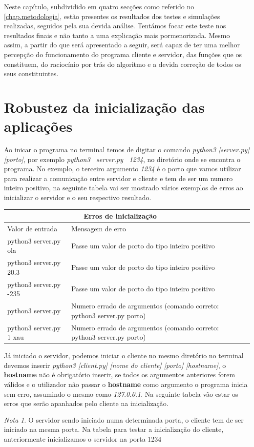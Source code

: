 \documentclass{report}
\theoremstyle{remark}
\newtheorem*{nota}{Nota}
\begin{document}
Neste capítulo, subdividido em quatro secções como referido no \autoref{chap.metodologia}, estão presentes os resultados dos testes e simulações realizadas, seguidos pela sua devida análise. Tentámos focar este teste nos resultados finais e não tanto a uma explicação mais pormenorizada. Mesmo assim, a partir do que será apresentado a seguir, será capaz de ter uma melhor percepção do funcionamento do programa cliente e servidor, das funções que os constituem, do raciocínio por trás do algoritmo e a devida correção de todos os seus constituintes.

\section{ Robustez da inicialização das aplicações}
\label{sec.rebustez}

Ao inicar o programa no terminal temos de digitar o comando \textit{python3 [server.py] [porto]}, por exemplo \textit{python3 \, server.py \, 1234}, no diretório onde se encontra o programa. No exemplo, o terceiro argumento \textit{1234} é o porto que vamos utilizar para realizar a comunicação entre servidor e cliente e tem de ser um numero inteiro positivo, na seguinte tabela vai ser mostrado vários exemplos de erros ao inicializar o servidor e o seu respectivo resultado. 


\begin{center}
\begin{tabular}{ |p{4cm}||p{7cm}|p{3cm}|p{3cm}|  }
 \hline
 \multicolumn{2}{|c|}{Erros de inicialização} \\
 \hline
 Valor de entrada & Mensagem de erro\\
 \hline
 python3 server.py ola  &   Passe um valor de porto do tipo inteiro positivo  \\ \hline
 python3 server.py 20.3   &   Passe um valor de porto do tipo inteiro positivo  \\ \hline
 python3 server.py -235   &   Passe um valor de porto do tipo inteiro positivo \\ \hline
 python3 server.py   &   Numero errado de argumentos (comando correto: python3 server.py porto) \\ \hline
 python3 server.py 1 xau   &   Numero errado de argumentos (comando correto: python3 server.py porto) \\\hline
\end{tabular}
\end{center}

Já iniciado o servidor, podemos iniciar o cliente no mesmo diretório no terminal devemos inserir \textit{python3 [client.py] [nome do cliente] [porto] [hostname]}, o \textbf{hostname} não é obrigatório inserir, se todos os argumentos anteriores forem válidos e o utilizador não passar o \textbf{hostname} como argumento o programa inicia sem erro, assumindo o mesmo como \textit{127.0.0.1}. Na seguinte tabela vão estar os erros que serão apanhados pelo cliente na inicialização.
\begin{nota}
O servidor sendo iniciado numa determinada porta, o cliente tem de ser iniciado na mesma porta. Na tabela para testar a inicialização do cliente, anteriormente inicializamos o servidor na porta 1234  
\end{nota}
\end{document}
